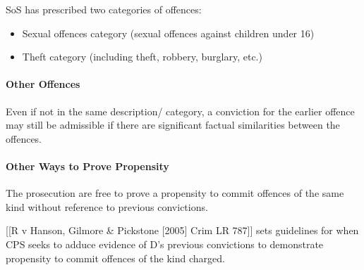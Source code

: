 \documentclass[
]{article}
\providecommand{\tightlist}{%
  \setlength{\itemsep}{0pt}\setlength{\parskip}{0pt}}
\begin{document}
SoS has prescribed two categories of offences:

\begin{itemize}
\tightlist
\item
  Sexual offences category (sexual offences against children under 16)
\item
  Theft category (including theft, robbery, burglary, etc.)
\end{itemize}

\hypertarget{other-offences}{%
\paragraph{Other Offences}\label{other-offences}}

Even if not in the same description/ category, a conviction for the
earlier offence may still be admissible if there are significant factual
similarities between the offences.

\hypertarget{other-ways-to-prove-propensity}{%
\paragraph{Other Ways to Prove
Propensity}\label{other-ways-to-prove-propensity}}

The prosecution are free to prove a propensity to commit offences of the
same kind without reference to previous convictions.

{[}{[}R v Hanson, Gilmore \& Pickstone {[}2005{]} Crim LR 787{]}{]} sets
guidelines for when CPS seeks to adduce evidence of D's previous
convictions to demonstrate propensity to commit offences of the kind
charged.
\end{document}
